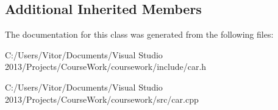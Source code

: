 \subsection*{Additional Inherited Members}


The documentation for this class was generated from the following files\+:\begin{DoxyCompactItemize}
\item 
C\+:/\+Users/\+Vitor/\+Documents/\+Visual Studio 2013/\+Projects/\+Course\+Work/coursework/include/car.\+h\item 
C\+:/\+Users/\+Vitor/\+Documents/\+Visual Studio 2013/\+Projects/\+Course\+Work/coursework/src/car.\+cpp\end{DoxyCompactItemize}
